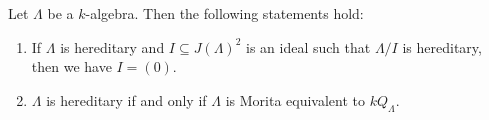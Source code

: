 
\begin{theorem}\label{3.6.2}
Let $\Lambda$ be a $k$-algebra. Then the following statements hold:
\begin{enumerate}
\item If $\Lambda$ is hereditary and $I\subseteq J(\Lambda)^2$ is an ideal such that $\Lambda/I$ is hereditary, then we have $I=(0)$.
\item $\Lambda$ is hereditary if and only if $\Lambda$ is Morita equivalent to $k Q_\Lambda$.
\end{enumerate}
\end{theorem}


